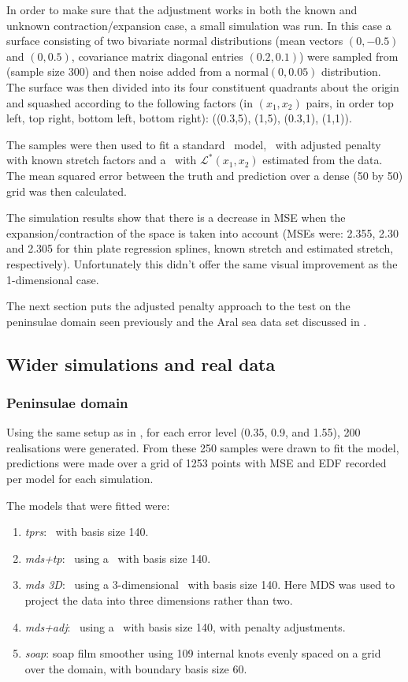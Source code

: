 In order to make sure that the adjustment works in both the known and unknown contraction/expansion case, a small simulation was run. In this case a surface consisting of two bivariate normal distributions (mean vectors $(0,-0.5)$ and $(0,0.5)$, covariance matrix diagonal entries $(0.2,0.1)$) were sampled from (sample size 300) and then noise added from a $\text{normal}(0,0.05)$ distribution. The surface was then divided into its four constituent quadrants about the origin and squashed according to the following factors (in $(x_1,x_2)$ pairs, in order top left, top right, bottom left, bottom right): ((0.3,5), (1,5), (0.3,1), (1,1)).

The samples were then used to fit a standard \tprs\ model, \tprs\ with adjusted penalty with known stretch factors and a \tprs\ with $\mathcal{L}^*(x_1,x_2)$ estimated from the data. The mean squared error between the truth and prediction over a dense (50 by 50) grid was then calculated.

The simulation results show that there is a decrease in MSE when the expansion/contraction of the space is taken into account (MSEs were: 2.355, 2.30 and 2.305 for thin plate regression splines, known stretch and estimated stretch, respectively). Unfortunately this didn't offer the same visual improvement as the 1-dimensional case.

The next section puts the adjusted penalty approach to the test on the peninsulae domain seen previously and the Aral sea data set discussed in .

\subsection{Wider simulations and real data}

\subsubsection{Peninsulae domain}
\label{wt2bigsim}

Using the same setup as in , for each error level (0.35, 0.9, and 1.55), 200 realisations were generated. From these 250 samples were drawn to fit the model, predictions were made over a grid of 1253 points with MSE and EDF recorded per model for each simulation. 

The models that were fitted were:
\begin{enumerate}
\item \emph{tprs}: \tprs\ with basis size 140.
\item \emph{mds+tp}: \mdsap\ using a \tprs\ with basis size 140.
\item \emph{mds 3D}: \mdsap\ using a 3-dimensional \tprs\ with basis size 140. Here MDS was used to project the data into three dimensions rather than two.
\item \emph{mds+adj}: \mdsap\ using a \tprs\ with basis size 140, with penalty adjustments.
\item \emph{soap}: soap film smoother using 109 internal knots evenly spaced on a grid over the domain, with boundary basis size 60.
\end{enumerate}

